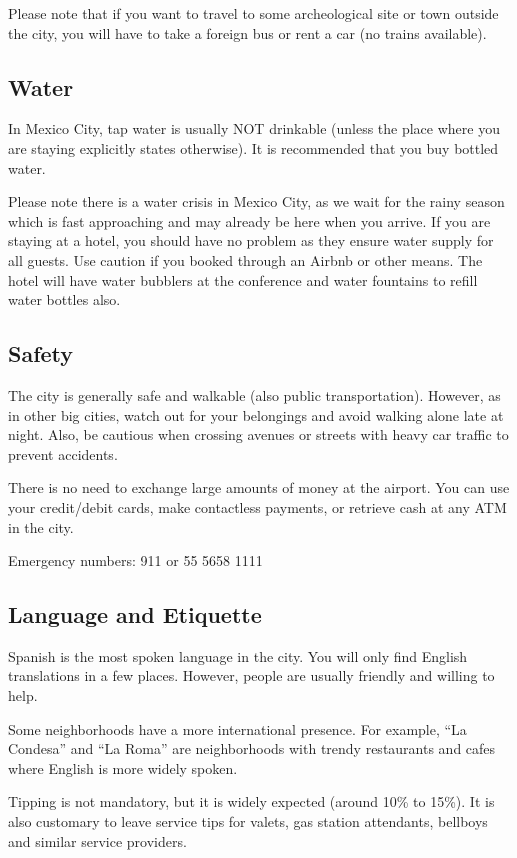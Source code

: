 Please note that if you want to travel to some archeological site or town outside the city, you will have to take a foreign bus or rent a car (no trains available).

\subsection*{Water}
In Mexico City, tap water is usually NOT drinkable (unless the place where you are staying explicitly states otherwise). It is recommended that you buy bottled water.

Please note there is a water crisis in Mexico City, as we wait for the rainy season which is fast approaching and may already be here when you arrive.
If you are staying at a hotel, you should have no problem as they ensure water supply for all guests. Use caution if you booked through an Airbnb or other means.
The hotel will have water bubblers at the conference and water fountains to refill water bottles also.

\subsection*{Safety}
The city is generally safe and walkable (also public transportation). However, as in other big cities, watch out for your belongings and avoid walking alone late at night. Also, be cautious when crossing avenues or streets with heavy car traffic to prevent accidents.

There is no need to exchange large amounts of money at the airport. You can use your credit/debit cards, make contactless payments, or retrieve cash at any ATM in the city.

Emergency numbers: 911  or  55 5658 1111

\subsection*{Language and Etiquette}
Spanish is the most spoken language in the city. You will only find English translations in a few places.  However, people are usually friendly and willing to help.

Some neighborhoods have a more international presence. For example, ``La Condesa'' and ``La Roma'' are neighborhoods with trendy restaurants and cafes where English is more widely spoken.

Tipping is not mandatory, but it is widely expected (around 10\% to 15\%).  It is  also customary to leave service tips for valets, gas station attendants, bellboys and similar service providers.

